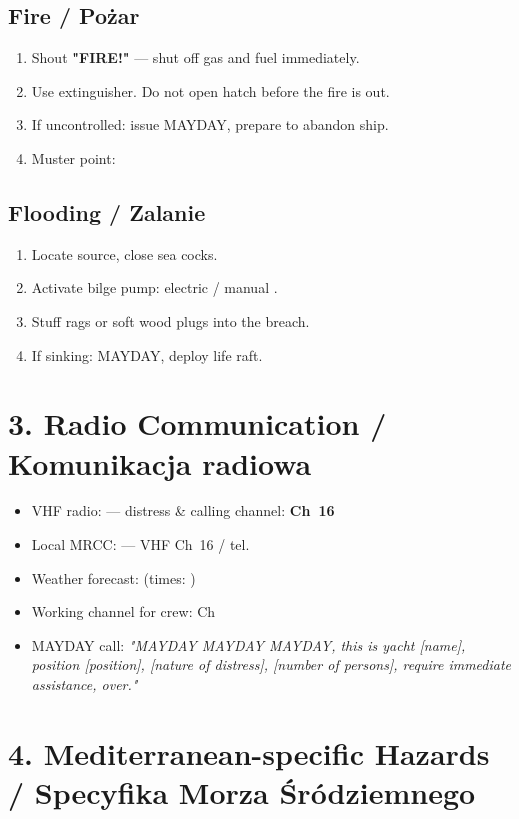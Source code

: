 \documentclass[a4paper,11pt]{article}
\begin{document}
\subsection*{Fire / Pożar}
\begin{enumerate}[noitemsep]
    \item Shout \textbf{"FIRE!"} — shut off gas and fuel immediately.
    \item Use extinguisher. Do not open hatch before the fire is out.
    \item If uncontrolled: issue MAYDAY, prepare to abandon ship.
    \item Muster point: \field{5cm}
\end{enumerate}

\subsection*{Flooding / Zalanie}
\begin{enumerate}[noitemsep]
    \item Locate source, close sea cocks.
    \item Activate bilge pump: electric \field{3cm} / manual \field{3cm}.
    \item Stuff rags or soft wood plugs into the breach.
    \item If sinking: MAYDAY, deploy life raft.
\end{enumerate}

\section*{3. Radio Communication / Komunikacja radiowa}

\begin{itemize}[noitemsep]
    \item VHF radio: \field{3cm} — distress \& calling channel: \textbf{Ch~16}
    \item Local MRCC: \field{6cm} — VHF Ch~16 / tel.\ \field{4cm}
    \item Weather forecast: \field{5cm} (times: \field{3cm})
    \item Working channel for crew: Ch~\field{1.5cm}
    \item MAYDAY call: \textit{"MAYDAY MAYDAY MAYDAY, this is yacht [name], position [position], [nature of distress], [number of persons], require immediate assistance, over."}
\end{itemize}

\section*{4. Mediterranean-specific Hazards / Specyfika Morza Śródziemnego}
\end{document}
